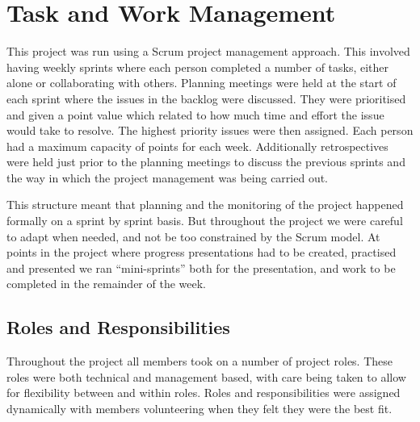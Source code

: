 \section{Task and Work Management} 
\label{Section:Task and Work Management}

This project was run using a Scrum project management approach. This involved having weekly sprints where each person completed a number of tasks, either alone or collaborating with others. Planning meetings were held at the start of each sprint where the issues in the backlog were discussed. They were prioritised and given a point value which related to how much time and effort the issue would take to resolve. The highest priority issues were then assigned. Each person had a maximum capacity of points for each week. Additionally retrospectives were held just prior to the planning meetings to discuss the previous sprints and the way in which the project management was being carried out.

This structure meant that planning and the monitoring of the project happened formally on a sprint by sprint basis. But throughout the project we were careful to adapt when needed, and not be too constrained by the Scrum model. At points in the project where progress presentations had to be created, practised and presented we ran ``mini-sprints'' both for the presentation, and work to be completed in the remainder of the week.

\subsection{Roles and Responsibilities}

Throughout the project all members took on a number of project roles. These roles were both technical and management based, with care being taken to allow for flexibility between and within roles. Roles and responsibilities were assigned dynamically with members volunteering when they felt they were the best fit.

